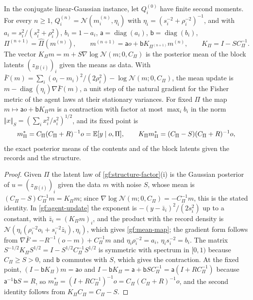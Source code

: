In the conjugate linear-Gaussian instance, let $Q_i^{(0)}$ have finite second
moments. For every $n\geq1$, $Q_i^{(n)}=\mathcal N(m_i^{(n)},\eta_i)$ with
$\eta_i=(s_i^{-2}+\rho_i^{-2})^{-1}$, and with
$a_i=s_i^2/(s_i^2+\rho_i^2)$, $b_i=1-a_i$, $\mathsf a=\operatorname{diag}(a_i)$,
$\mathsf b=\operatorname{diag}(b_i)$,
\begin{equation}
 \Pi^{(n+1)}=\hat\Pi(m^{(n)}),\qquad
 m^{(n+1)}=\mathsf ao+\mathsf bK_{\Pi^{(n+1)}}m^{(n)},\qquad
 K_\Pi=I-SC_\Pi^{-1}.
 \label{gf:mean-map}
\end{equation}
The vector $K_\Pi m=m+S\nabla\log\mathcal N(m;0,C_\Pi)$ is the posterior mean of
the block latents $(z_{B(i)})_i$ given the means as data. With
$\bar F(m)=\sum_i(o_i-m_i)^2/(2\rho_i^2)-\log\mathcal N(m;0,C_\Pi)$, the mean
update is $m-\operatorname{diag}(\eta_i)\nabla\bar F(m)$, a unit step of the
natural gradient for the Fisher metric of the agent laws at their stationary
variances. For fixed $\Pi$ the map $m\mapsto\mathsf ao+\mathsf bK_\Pi m$ is a
contraction with factor at most $\max_ib_i$ in the norm
$\Vert x\Vert_S=(\sum_ix_i^2/s_i^2)^{1/2}$, and its fixed point is
\begin{equation}
 m^*_\Pi=C_\Pi(C_\Pi+R)^{-1}o=\mathbb E[y\mid o,\Pi],
 \qquad K_\Pi m^*_\Pi=(C_\Pi-S)(C_\Pi+R)^{-1}o,
 \label{gf:fixed-point}
\end{equation}
the exact posterior means of the contents and of the block latents given the
records and the structure.
\begin{proof}
Given $\Pi$ the latent law of \cref{gf:structure-factor}(i) is the Gaussian
posterior of $u=(z_{B(i)})_i$ given the data $m$ with noise $S$, whose mean is
$(C_\Pi-S)C_\Pi^{-1}m=K_\Pi m$; since $\nabla\log\mathcal N(m;0,C_\Pi)=
-C_\Pi^{-1}m$, this is the stated identity. In \cref{gf:agent-update} the
exponent is $-(y-\bar z_i)^2/(2s_i^2)$ up to a constant, with $\bar z_i=(K_\Pi
m)_i$, and the product with the record density is
$\mathcal N(\eta_i(\rho_i^{-2}o_i+s_i^{-2}\bar z_i),\eta_i)$, which gives
\cref{gf:mean-map}; the gradient form follows from
$\nabla\bar F=-R^{-1}(o-m)+C_\Pi^{-1}m$ and $\eta_i\rho_i^{-2}=a_i$,
$\eta_is_i^{-2}=b_i$. The matrix $S^{-1/2}K_\Pi S^{1/2}=I-S^{1/2}C_\Pi^{-1}S^{1/2}$
is symmetric with spectrum in $[0,1)$ because $C_\Pi\geq S>0$, and
$\mathsf b$ commutes with $S$, which gives the contraction. At the fixed
point, $(I-\mathsf bK_\Pi)m=\mathsf ao$ and $I-\mathsf bK_\Pi=\mathsf a
+\mathsf bSC_\Pi^{-1}=\mathsf a(I+RC_\Pi^{-1})$ because $\mathsf a^{-1}\mathsf
bS=R$, so $m^*_\Pi=(I+RC_\Pi^{-1})^{-1}o=C_\Pi(C_\Pi+R)^{-1}o$, and the second
identity follows from $K_\Pi C_\Pi=C_\Pi-S$.
\end{proof}

